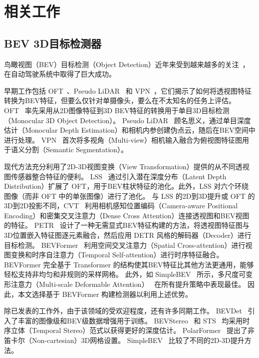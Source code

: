 \section{相关工作}
\subsection{BEV 3D目标检测器}
鸟瞰视图（BEV）目标检测（Object Detection）近年来受到越来越多的关注~\cite{OFT,VPN,pseudo-lidar,LSS,bevformer,CVT,PETR}，在自动驾驶系统中取得了巨大成功。

早期工作包括 OFT~\cite{OFT}、Pseudo LiDAR~\cite{pseudo-lidar} 和 VPN~\cite{VPN}，它们揭示了如何将透视图特征转换为BEV特征，但要么仅针对单摄像头，要么在不太知名的任务上评估。
OFT~\cite{OFT} 率先采用从2D图像特征到3D BEV特征的转换用于单目3D目标检测（Monocular 3D Object Detection）。
Pseudo LiDAR~\cite{pseudo-lidar} 顾名思义，通过单目深度估计（Monocular Depth Estimation）和相机内参创建伪点云，随后在BEV空间中进行处理。
VPN~\cite{VPN} 首次将多视角（Multi-view）相机输入融合为俯视图特征图用于语义分割（Semantic Segmentation）。

现代方法充分利用了2D-3D视图变换（View Transformation）提供的从不同透视图传感器整合特征的便利。
LSS~\cite{LSS} 通过引入潜在深度分布（Latent Depth Distribution）扩展了 OFT，用于BEV柱状特征的池化。此外，LSS 对六个环绕图像（而非 OFT 中的单张图像）进行了池化。
与 LSS 的2D到3D提升或 OFT 的3D到2D投影不同，CVT~\cite{CVT} 利用相机感知位置编码（Camera-aware Positional Encoding）和密集交叉注意力（Dense Cross Attention）连接透视图和BEV视图的特征。
PETR~\cite{PETR} 设计了一种无需显式BEV特征构建的方法，将透视图特征图与3D位置嵌入特征图逐元素融合，然后应用 DETR 风格的解码器（Decoder）进行目标检测。
BEVFormer~\cite{bevformer} 利用空间交叉注意力（Spatial Cross-attention）进行视图变换和时序自注意力（Temporal Self-attention）进行时序特征融合。BEVFormer 完全基于 Transformer 的结构使其BEV特征比其他方法更通用，能够轻松支持非均匀和非规则的采样网格。
此外，如 SimpleBEV~\cite{simplebev} 所示，多尺度可变形注意力（Multi-scale Deformable Attention）~\cite{deformable-detr} 在所有提升策略中表现最佳。
因此，本文选择基于 BEVFormer 构建检测器以利用上述优势。

除已发表的工作外，由于该领域的受欢迎程度，还有许多同期工作。
BEVDet~\cite{BEVDet} 引入了丰富的图像级和BEV级数据增强用于训练。
BEVStereo~\cite{bevstereo} 和 STS~\cite{STS} 均采用时序立体（Temporal Stereo）范式以获得更好的深度估计。
PolarFormer~\cite{polarformer} 提出了非笛卡尔（Non-cartesian）3D网格设置。
SimpleBEV~\cite{simplebev} 比较了不同的2D-3D提升方法。

